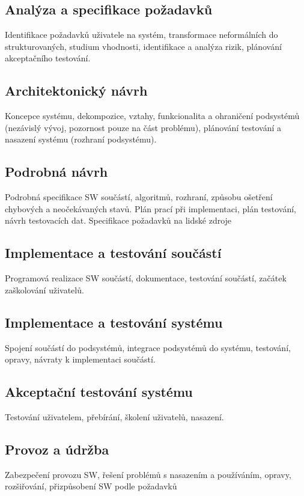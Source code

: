 \documentclass[a4paper, 11pt]{report}
\begin{document}
\subsection{Analýza a specifikace požadavků}
Identifikace požadavků uživatele na systém, transformace neformálních do strukturovaných, studium vhodnosti, identifikace a analýza rizik, plánování akceptačního testování.

\subsection{Architektonický návrh}
Koncepce systému, dekompozice, vztahy, funkcionalita a ohraničení podsystémů (nezávislý vývoj, pozornost pouze na část problému), plánování testování a nasazení systému (rozhraní podsystému).

\subsection{Podrobná návrh}
Podrobná specifikace SW součástí, algoritmů, rozhraní, způsobu ošetření chybových a neočekávaných stavů. Plán prací při implementaci, plán testování, návrh testovacích dat. Specifikace požadavků na lidské zdroje

\subsection{Implementace a testování součástí}
Programová realizace SW součástí, dokumentace, testování součástí, začátek zaškolování uživatelů.

\subsection{Implementace a testování systému}
Spojení součástí do podsystémů, integrace podsystémů do systému, testování, opravy, návraty k implementaci součástí.

\subsection{Akceptační testování systému} Testování uživatelem, přebírání, školení uživatelů, nasazení.

\subsection{Provoz a údržba}
Zabezpečení provozu SW, řešení problémů s nasazením a používáním, opravy, rozšiřování, přizpůsobení SW podle požadavků
\end{document}
